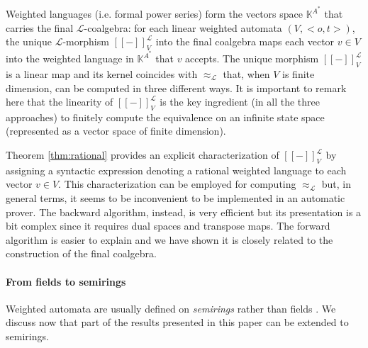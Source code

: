 \documentclass[3p]{elsarticle}
\newcommand{\fW}{\mathcal{W}}    %
\newcommand{\fL}{\mathcal{L}}    %
\newcommand{\beh}[3]{\left[\!\left[ #1 \right]\!\right]^{#2}_{#3}} %
\newcommand{\K}{\mathbb{K}}            %
\begin{document}

Weighted languages (i.e. formal power series) form the vectors space $\K^{A^*}$ that carries the
final $\fL$-coalgebra: for each linear weighted automata $(V, <o,t>)$, the unique $\fL$-morphism
$\beh{-}{\fL}{V}$ into the final coalgebra maps each vector $v\in V$ into the weighted language
in $\K^{A^*}$ that $v$ accepts. The unique morphism $\beh{-}{\fL}{V}$ is a linear map and its
kernel coincides with $\approx_{\fL}$ that, when $V$ is finite dimension, can be computed in
three different ways. It is important to remark here that the linearity of $\beh{-}{\fL}{V}$ is the
key ingredient (in all the three approaches) to finitely compute the equivalence on an infinite
state space (represented as a vector space of finite dimension).

Theorem \ref{thm:rational} provides an explicit characterization of $\beh{-}{\fL}{V}$ by assigning  a
syntactic expression denoting a rational weighted language to each vector $v\in V$. This characterization
can be employed for computing $\approx_{\fL}$ but, in general terms, it seems to be
inconvenient to be implemented in an automatic prover. The backward algorithm, instead, is very
efficient but its presentation is a bit complex since it requires dual spaces and transpose maps.
The forward algorithm is easier to explain and we have shown it is closely related to the construction
of the final coalgebra.


\bigskip
%
\paragraph{From fields to semirings}
Weighted automata are usually defined on \emph{semirings} rather than fields \cite{Moh09}.
We discuss now that part of the results presented in this paper can be extended to semirings.
\end{document}
